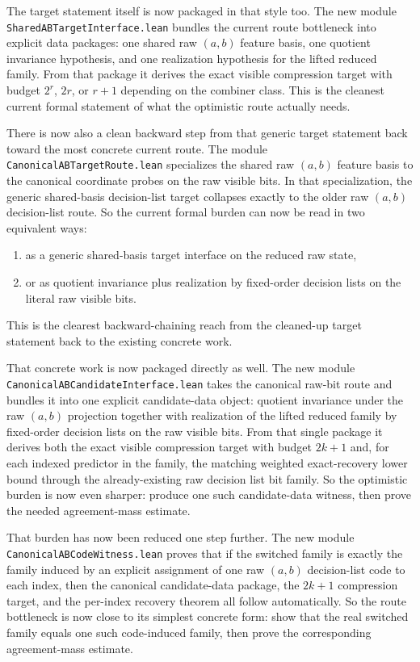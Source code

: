 \documentclass[11pt]{article}
\theoremstyle{remark}
\begin{document}
The target statement itself is now packaged in that style too.  The new module
\texttt{SharedABTargetInterface.lean} bundles the current route bottleneck into
explicit data packages: one shared raw \((a,b)\) feature basis, one quotient
invariance hypothesis, and one realization hypothesis for the lifted reduced
family.  From that package it derives the exact visible compression target with
budget \(2^r\), \(2r\), or \(r+1\) depending on the combiner class.  This is
the cleanest current formal statement of what the optimistic route actually
needs.

There is now also a clean backward step from that generic target statement back
toward the most concrete current route.  The module
\texttt{CanonicalABTargetRoute.lean} specializes the shared raw \((a,b)\)
feature basis to the canonical coordinate probes on the raw visible bits.  In
that specialization, the generic shared-basis decision-list target collapses
exactly to the older raw \((a,b)\) decision-list route.  So the current formal
burden can now be read in two equivalent ways:
\begin{enumerate}[leftmargin=1.5em]
  \item as a generic shared-basis target interface on the reduced raw state,
  \item or as quotient invariance plus realization by fixed-order decision
  lists on the literal raw visible bits.
\end{enumerate}
This is the clearest backward-chaining reach from the cleaned-up target
statement back to the existing concrete work.

That concrete work is now packaged directly as well.  The new module
\texttt{CanonicalABCandidateInterface.lean} takes the canonical raw-bit route
and bundles it into one explicit candidate-data object: quotient invariance
under the raw \((a,b)\) projection together with realization of the lifted
reduced family by fixed-order decision lists on the raw visible bits.  From
that single package it derives both the exact visible compression target with
budget \(2k+1\) and, for each indexed predictor in the family, the matching
weighted exact-recovery lower bound through the already-existing raw decision
list bit family.  So the optimistic burden is now even sharper: produce one
such candidate-data witness, then prove the needed agreement-mass estimate.

That burden has now been reduced one step further.  The new module
\texttt{CanonicalABCodeWitness.lean} proves that if the switched family is
exactly the family induced by an explicit assignment of one raw \((a,b)\)
decision-list code to each index, then the canonical candidate-data package,
the \(2k+1\) compression target, and the per-index recovery theorem all follow
automatically.  So the route bottleneck is now close to its simplest concrete
form: show that the real switched family equals one such code-induced family,
then prove the corresponding agreement-mass estimate.
\end{document}

